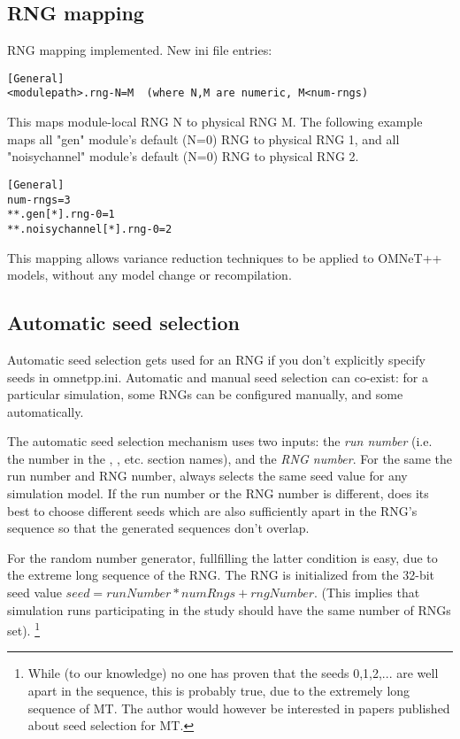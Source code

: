 \subsection{RNG mapping}

RNG mapping implemented. New ini file entries:

\begin{verbatim}
[General]
<modulepath>.rng-N=M  (where N,M are numeric, M<num-rngs)
\end{verbatim}

This maps module-local RNG N to physical RNG M. The following
example maps all "gen" module's default (N=0) RNG to physical RNG 1,
and all "noisychannel" module's default (N=0) RNG to physical RNG 2.

\begin{verbatim}
[General]
num-rngs=3
**.gen[*].rng-0=1
**.noisychannel[*].rng-0=2
\end{verbatim}

This mapping allows variance reduction techniques to be applied to
OMNeT++ models, without any model change or recompilation.


\subsection{Automatic seed selection}

Automatic seed selection gets used for an RNG if you don't explicitly
specify seeds in omnetpp.ini. Automatic and manual seed selection can
co-exist: for a particular simulation, some RNGs can be configured
manually, and some automatically.

The automatic seed selection mechanism uses two inputs: the \textit{run number}
(i.e. the number in the \ttt{[Run 1]}, \ttt{[Run 2]}, etc. section names),
and the \textit{RNG number}. For the same the run number and RNG number,
{\opp} always selects the same seed value for any simulation model.
If the run number or the RNG number is different, {\opp} does its best
to choose different seeds which are also sufficiently apart in the RNG's sequence
so that the generated sequences don't overlap.

For the  random number generator, fullfilling the latter
condition is easy, due to the extreme long sequence of the RNG.
The RNG is initialized from the 32-bit seed value $seed = runNumber*numRngs + rngNumber$.
(This implies that simulation runs participating in the study should have
the same number of RNGs set).
    \footnote{While (to our knowledge) no one has proven that the seeds 0,1,2,...
    are well apart in the sequence, this is probably true, due to the extremely
    long sequence of MT. The author would however be interested in papers
    published about seed selection for MT.}


